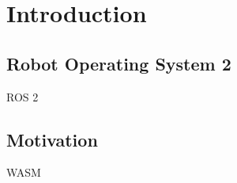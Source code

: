 \chapter{Introduction}\label{cha:introduction}

\section{Robot Operating System 2}

    \ac{ROS} 2

\section{Motivation}


    \ac{WASM}